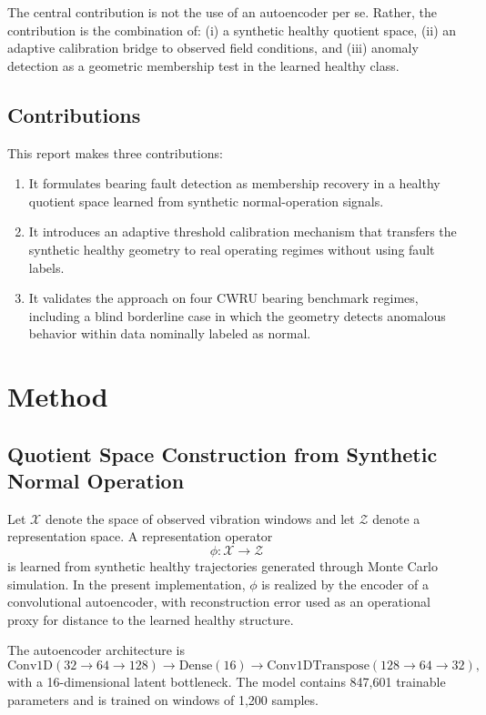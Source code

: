 \documentclass[11pt]{article}
\newcommand{\X}{\mathcal{X}}
\newcommand{\Z}{\mathcal{Z}}
\begin{document}
The central contribution is not the use of an autoencoder per se. Rather, the contribution is the combination of: (i) a synthetic healthy quotient space, (ii) an adaptive calibration bridge to observed field conditions, and (iii) anomaly detection as a geometric membership test in the learned healthy class.

\subsection*{Contributions}

This report makes three contributions:

\begin{enumerate}[label=(\roman*)]
    \item It formulates bearing fault detection as membership recovery in a healthy quotient space learned from synthetic normal-operation signals.
    \item It introduces an adaptive threshold calibration mechanism that transfers the synthetic healthy geometry to real operating regimes without using fault labels.
    \item It validates the approach on four CWRU bearing benchmark regimes, including a blind borderline case in which the geometry detects anomalous behavior within data nominally labeled as normal.
\end{enumerate}

\section{Method}

\subsection{Quotient Space Construction from Synthetic Normal Operation}

Let $\X$ denote the space of observed vibration windows and let $\Z$ denote a representation space. A representation operator
\begin{equation}
    \phi : \X \rightarrow \Z
\end{equation}
is learned from synthetic healthy trajectories generated through Monte Carlo simulation. In the present implementation, $\phi$ is realized by the encoder of a convolutional autoencoder, with reconstruction error used as an operational proxy for distance to the learned healthy structure.

The autoencoder architecture is
\begin{equation*}
    \mathrm{Conv1D}(32 \rightarrow 64 \rightarrow 128)
    \rightarrow \mathrm{Dense}(16)
    \rightarrow \mathrm{Conv1DTranspose}(128 \rightarrow 64 \rightarrow 32),
\end{equation*}
with a 16-dimensional latent bottleneck. The model contains 847,601 trainable parameters and is trained on windows of 1,200 samples.
\end{document}

